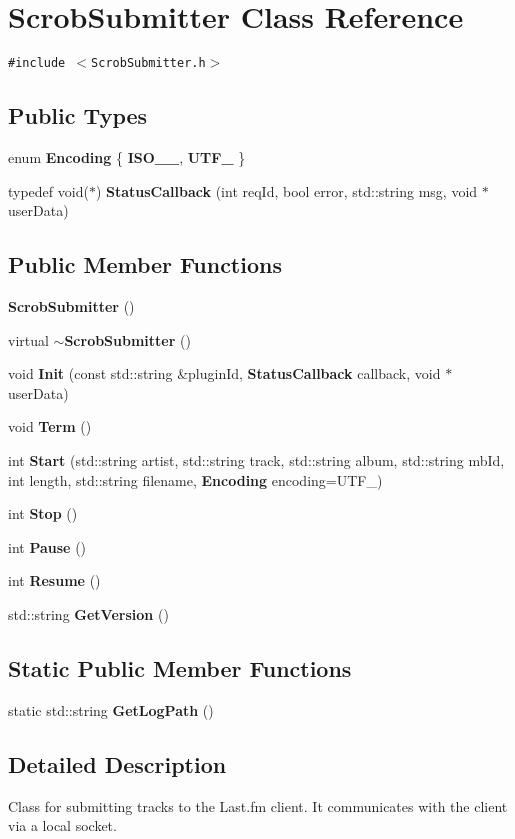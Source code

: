 \section{ScrobSubmitter Class Reference}
\label{class_scrob_submitter}
{\tt \#include $<$ScrobSubmitter.h$>$}

\subsection*{Public Types}
\begin{CompactItemize}
\item 
enum {\bf Encoding} \{ \textbf{ISO\_\_}, 
\textbf{UTF\_}
 \}
\item 
typedef void($\ast$) {\bf StatusCallback} (int reqId, bool error, std::string msg, void $\ast$userData)
\end{CompactItemize}
\subsection*{Public Member Functions}
\begin{CompactItemize}
\item 
{\bf ScrobSubmitter} ()
\item 
virtual {\bf $\sim$ScrobSubmitter} ()
\item 
void {\bf Init} (const std::string \&pluginId, {\bf StatusCallback} callback, void $\ast$userData)
\item 
void {\bf Term} ()
\item 
int {\bf Start} (std::string artist, std::string track, std::string album, std::string mbId, int length, std::string filename, {\bf Encoding} encoding=UTF\_)
\item 
int {\bf Stop} ()
\item 
int {\bf Pause} ()
\item 
int {\bf Resume} ()
\item 
std::string {\bf GetVersion} ()
\end{CompactItemize}
\subsection*{Static Public Member Functions}
\begin{CompactItemize}
\item 
static std::string {\bf GetLogPath} ()
\end{CompactItemize}


\subsection{Detailed Description}
Class for submitting tracks to the Last.fm client. It communicates with the client via a local socket.

